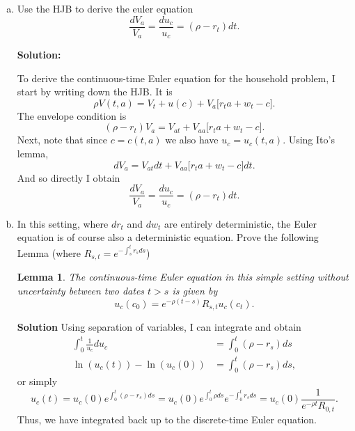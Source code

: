 \documentclass[11pt]{extarticle}
\theoremstyle{plain}
\newtheorem{lem}[thm]{Lemma}
\theoremstyle{definition}
\begin{document}
\begin{enumerate}[(a)]

\item Use the HJB to derive the euler equation
\begin{equation*}
	\frac{dV_a}{V_a} = \frac{du_c}{u_c} =  (\rho - r_t) dt. 
\end{equation*}

\textbf{Solution:}

\vspace{3mm}
\noindent
To derive the continuous-time Euler equation for the household problem, I start by writing down the HJB. It is 
\begin{equation*}
	\rho V(t,a) = V_t + u(c) + V_a \Big[ r_t a + w_t - c \Big]. 
\end{equation*}
The envelope condition is 
\begin{equation*}
	(\rho - r_t) V_a = V_{at} +  V_{aa} \Big[ r_t a + w_t - c \Big] .
\end{equation*}
Next, note that since $c = c(t,a)$ we also have $u_c = u_c(t,a)$. Using Ito's lemma, 
\begin{equation*}
	dV_a = V_{at} dt + V_{aa} \Big[ r_t a + w_t - c \Big] dt. 
\end{equation*}
And so directly I obtain 
\begin{equation*}
	\frac{dV_a}{V_a} = \frac{du_c}{u_c} =  (\rho - r_t) dt. 
\end{equation*}

\item In this setting, where $dr_t$ and $dw_t$ are entirely deterministic, the Euler equation is of course also a deterministic equation. Prove the following Lemma (where $R_{s,t}=e^{-\int_s^t r_s ds}$)
\begin{lem} 
	
	The continuous-time Euler equation in this simple setting without uncertainty between two dates $t > s$ is given by
	\begin{equation*}
		u_c(c_0) = e^{- \rho (t-s)} R_{s,t} u_c(c_t). 
	\end{equation*}
\end{lem}


\textbf{Solution}
Using separation of variables, I can integrate and obtain 
\begin{align*}
	\int_0^t \frac{1}{u_c} du_c &=  \int_0^t (\rho - r_s) ds \\
	\ln(u_c(t)) - \ln(u_c(0)) &=  \int_0^t (\rho - r_s) ds,
\end{align*}
or simply 
\begin{equation*}
	u_c(t) = u_c(0) e^{\int_0^t (\rho - r_s) ds} = u_c(0) e^{\int_0^t \rho ds} e^{- \int_0^t r_s ds} = u_c(0) \frac{1 }{e^{-\rho t}R_{0,t}}.
\end{equation*}
Thus, we have integrated back up to the discrete-time Euler equation. 


\end{enumerate}
\end{document}
